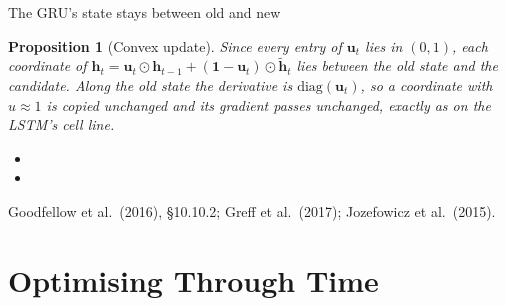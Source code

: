 \documentclass[aspectratio=169, 11pt]{beamer}
\newtheorem{propx}[theorem]{Proposition}
\newcommand{\srcline}[1]{%
  \par\vspace{0.25em}%
  {\scriptsize\color{mcMuted}\hfill #1\par}}
\newcommand{\src}[3]{}      %
\begin{document}
\begin{frame}{The GRU's state stays between old and new}
  \src{goodfellow2016}{section}{10.10.2}
  \src{greff2017}{section}{V.A}
  \src{jozefowicz2015}{section}{4}
  \vspace{-0.3em}
  \begin{propx}[Convex update]\label{th:convex}
    \small
    Since every entry of $\mathbf{u}_t$ lies in $(0, 1)$, each coordinate of
    $\mathbf{h}_t = \mathbf{u}_t \odot \mathbf{h}_{t-1} + (\mathbf{1} - \mathbf{u}_t) \odot \tilde{\mathbf{h}}_t$
    lies between the old state and the candidate. Along the old state the
    derivative is $\mathrm{diag}(\mathbf{u}_t)$, so a coordinate with
    $u \approx 1$ is copied unchanged and its gradient passes unchanged,
    exactly as on the LSTM's cell line.
  \end{propx}
  \vspace{0.1em}
  {\footnotesize
  \begin{itemize}\itemsep0.24em
    \item {}
    \item {}
  \end{itemize}}
  \srcline{Goodfellow et al.\ (2016), \S10.10.2; Greff et al.\ (2017); Jozefowicz et al.\ (2015).}
\end{frame}


\section{Optimising Through Time}
\end{document}
